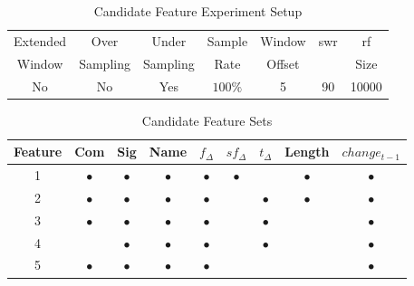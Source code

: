 \begin{table}[h]
\begin{center}

    \begin{tabular}{|c|c|c|c|c|c|c|}
        \hline
        Extended & Over & Under & Sample & Window & \gls{swr} & \gls{rf} \\
        Window & Sampling & Sampling & Rate & Offset &  & Size \\ \hline
        No & No & Yes & $100\%$ & 5 & 90 & 10000 \\ \hline
    \end{tabular}
    \caption{Candidate Feature Experiment Setup}
    \label{tab:rf_feature_experiment_setup}
\end{center}

\end{table}


\begin{table}[h]
\begin{center}

    \begin{tabular}{|c|c|c|c|c|c|c|c|c|}
        \hline
        Feature & Com & Sig & Name & $f_{\Delta}$ & $sf_{\Delta}$ & $t_\Delta$ & Length & $change_{t-1}$ \\
         \hline
        1 & $\bullet$ & $\bullet$ & $\bullet$ & $\bullet$ & $\bullet$ & & $\bullet$ & $\bullet$ \\
        2 & $\bullet$ & $\bullet$ & $\bullet$ & $\bullet$ & & $\bullet$ & $\bullet$ & $\bullet$ \\
        3 & $\bullet$ & $\bullet$ & $\bullet$ & $\bullet$ & & $\bullet$ & & $\bullet$ \\
        4 & & $\bullet$ & $\bullet$ & $\bullet$ & & $\bullet$ & & $\bullet$ \\
        5 & $\bullet$ & $\bullet$ & $\bullet$ & $\bullet$ & & & & $\bullet$ \\ \hline
    \end{tabular}
    \caption{Candidate Feature Sets}
    \label{tab:rf_feature_experiment_sets}
\end{center}

\end{table}

